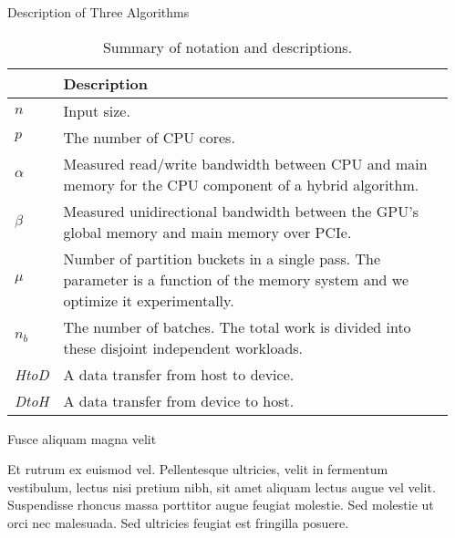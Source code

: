 \documentclass[final]{beamer}
\newlength{\sepwidth}
\newlength{\colwidth}
\newcommand{\separatorcolumn}{\begin{column}{\sepwidth}\end{column}}
\def\DtoH{\textit{DtoH}}
\def\HtoD{\textit{HtoD}}
\begin{document}
\begin{frame}[t]
\begin{columns}[t]
\separatorcolumn

\begin{column}{\colwidth}

  \begin{block}{Description of Three Algorithms}



   \begin{table}[htp]
   \centering
   \begin{footnotesize}
   \caption{Summary of notation and descriptions.}\label{tab:notation}
   \begin{tabularx}{\columnwidth}{|l|X|} \hline
      & Description\\ \hline
   $n$& Input size.\\ \hline
   $p$ & The number of CPU cores.\\\hline
   $\alpha$ & Measured read/write bandwidth between CPU and main memory for the CPU component of a hybrid algorithm. \\\hline
   $\beta$  & Measured unidirectional bandwidth between the GPU's global memory and main memory over PCIe.\\\hline
   $\mu$ & Number of partition buckets in a single pass.  The parameter is a function of the memory system and we optimize it experimentally.  \\\hline
   $n_b$ & The number of batches. The total work is divided into these disjoint independent workloads. \\\hline
   \HtoD & A data transfer from host to device.\\\hline
   \DtoH & A data transfer from device to host.\\\hline
   \end{tabularx}
   \end{footnotesize}
   \end{table}


  \end{block}

  \begin{block}{Fusce aliquam magna velit}

    Et rutrum ex euismod vel. Pellentesque ultricies, velit in fermentum
    vestibulum, lectus nisi pretium nibh, sit amet aliquam lectus augue vel
    velit. Suspendisse rhoncus massa porttitor augue feugiat molestie. Sed
    molestie ut orci nec malesuada. Sed ultricies feugiat est fringilla
    posuere.


\end{block}
\end{column}
\end{columns}
\end{frame}
\end{document}
